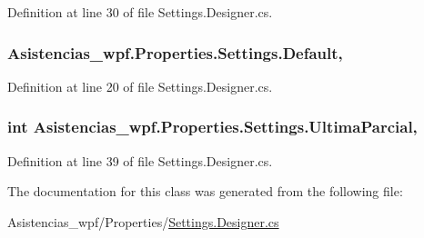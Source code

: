 Definition at line 30 of file Settings.\-Designer.\-cs.

\hypertarget{class_asistencias__wpf_1_1_properties_1_1_settings_adda8dc133197e0813e029711e37bb30f}{
\subsubsection[{Default}]{ Asistencias\-\_\-wpf.\-Properties.\-Settings.\-Default\hspace{0.3cm}{\ttfamily [static]}, {\ttfamily [get]}}}\label{class_asistencias__wpf_1_1_properties_1_1_settings_adda8dc133197e0813e029711e37bb30f}


Definition at line 20 of file Settings.\-Designer.\-cs.

\hypertarget{class_asistencias__wpf_1_1_properties_1_1_settings_a836e31c2aacc9782289d0594f392267a}{
\subsubsection[{Ultima\-Parcial}]{\setlength{\rightskip}{0pt plus 5cm}int Asistencias\-\_\-wpf.\-Properties.\-Settings.\-Ultima\-Parcial\hspace{0.3cm}{\ttfamily [get]}, {\ttfamily [set]}}}\label{class_asistencias__wpf_1_1_properties_1_1_settings_a836e31c2aacc9782289d0594f392267a}


Definition at line 39 of file Settings.\-Designer.\-cs.



The documentation for this class was generated from the following file\-:\begin{DoxyCompactItemize}
\item 
Asistencias\-\_\-wpf/\-Properties/\hyperlink{_asistencias__wpf_2_properties_2_settings_8_designer_8cs}{Settings.\-Designer.\-cs}\end{DoxyCompactItemize}
